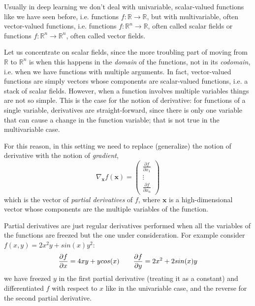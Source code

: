 
Usually in deep learning we don't deal with univariable, scalar-valued functions like we have seen before, i.e. functions $f: \mathbb{R} \to \mathbb{R}$, but with multivariable, often vector-valued functions, i.e. functions $f: \mathbb{R}^n \to \mathbb{R}$, often called scalar fields or functions $f: \mathbb{R}^n \to \mathbb{R}^n$, often called vector fields.

Let us concentrate on scalar fields, since the more troubling part of moving from $\mathbb{R}$ to $\mathbb{R}^n$ is when this happens in the \emph{domain} of the functions, not in its \emph{codomain}, i.e. when we have functions with multiple arguments. In fact, vector-valued functions are simply vectors whose components are scalar-valued functions, i.e. a stack of scalar fields. However, when a function involves multiple variables things are not so simple. This is the case for the notion of derivative: for functions of a single variable, derivatives are straight-forward, since there is only one variable that can cause a change in the function variable; that is not true in the multivariable case. 

For this reason, in this setting we need to replace (generalize) the notion of derivative with the notion of \emph{gradient},
\begin{equation}
	\nabla_{\mathbf{x}}f(\mathbf{x}) = \begin{pmatrix}%
										\frac{\partial f}{\partial x_1} \\
										\vdots \\
										\frac{\partial f}{\partial x_n}%
									   \end{pmatrix}
\end{equation}
which is the vector of \emph{partial derivatives} of $f$, where $\mathbf{x}$ is a high-dimensional vector whose components are the multiple variables of the function.

Partial derivatives are just regular derivatives performed when all the variables of the functions are freezed but the one under consideration. For example consider $f(x, y) = 2x^2y + sin(x) y^2$:
\begin{equation}
    \pdv{f}{x} = 4xy + y cos(x) \qquad \pdv{f}{y} = 2x^2 + 2 sin(x) y
\end{equation}
we have freezed $y$ in the first partial derivative (treating it as a constant) and differentiated $f$ with respect to $x$ like in the univariable case, and the reverse for the second partial derivative.

